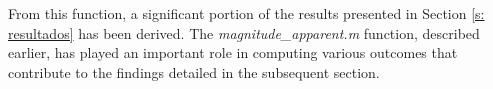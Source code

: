             







From this function, a significant portion of the results presented in Section \ref{s: resultados} has been derived. The \textit{magnitude\_apparent.m} function, described earlier, has played an important role in computing various outcomes that contribute to the findings detailed in the subsequent section. 

